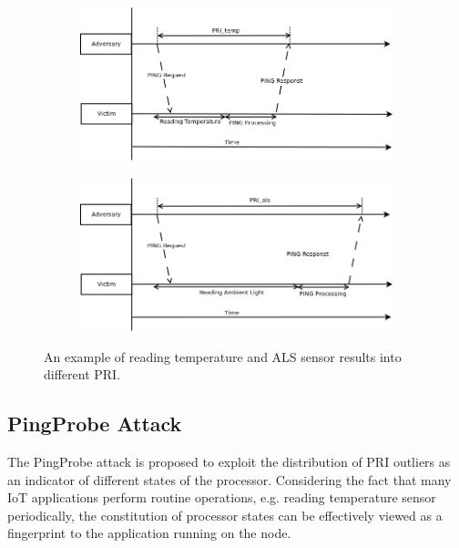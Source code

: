 \begin{figure}[ht!]
	\center
	\begin{subfigure}{0.8\textwidth}
	{
		\center
		\includegraphics[width=\textwidth]{fig/PingProbe_temperature.png}
	}
	\end{subfigure}
	\begin{subfigure}{0.8\textwidth}
	{
		\center
		\includegraphics[width=\textwidth]{fig/PingProbe_als.png}
	}
	\end{subfigure}
	\caption{An example of reading temperature and ALS sensor results into different PRI.}
	\label{PingProbeTheory}
\end{figure}

\subsection{PingProbe Attack}
The PingProbe attack is proposed to exploit the distribution of PRI outliers as an indicator of different states of the processor. Considering the fact that many IoT applications perform routine operations, e.g. reading temperature sensor periodically, the constitution of processor states can be effectively viewed as a fingerprint to the application running on the node. 

